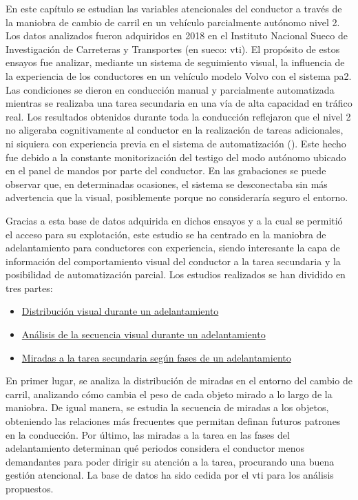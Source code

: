 En este capítulo se estudian las variables atencionales del conductor a través de la maniobra de cambio de carril en un vehículo parcialmente autónomo nivel 2. Los datos analizados fueron adquiridos en 2018 en el Instituto Nacional Sueco de Investigación de Carreteras y Transportes (en sueco: \gls{vti}). El propósito de estos ensayos fue analizar, mediante un sistema de seguimiento visual, la influencia de la experiencia de los conductores en un vehículo modelo Volvo con el sistema \gls{pa2}. Las condiciones se dieron en conducción manual y parcialmente automatizada mientras se realizaba una tarea secundaria en una vía de alta capacidad en tráfico real. Los resultados obtenidos durante toda la conducción reflejaron que el nivel 2 no aligeraba cognitivamente al conductor en la realización de tareas adicionales, ni siquiera con experiencia previa en el sistema de automatización (\cite{solismarcos}). Este hecho fue debido a la constante monitorización del testigo del modo autónomo ubicado en el panel de mandos por parte del conductor. En las grabaciones se puede observar que, en determinadas ocasiones, el sistema se desconectaba sin más advertencia que la visual, posiblemente porque no consideraría seguro el entorno.

Gracias a esta base de datos adquirida en dichos ensayos y a la cual se permitió el acceso para su explotación, este estudio se ha centrado en la maniobra de adelantamiento para conductores con experiencia, siendo interesante la capa de información del comportamiento visual del conductor a la tarea secundaria y la posibilidad de automatización parcial. Los estudios realizados se han dividido en tres partes:

\begin{itemize}
    \item \hyperref[3231]{Distribución visual durante un adelantamiento}
    \item \hyperref[3232]{Análisis de la secuencia visual durante un adelantamiento}
    \item \hyperref[3233]{Miradas a la tarea secundaria según fases de un adelantamiento}
\end{itemize}

En primer lugar, se analiza la distribución de miradas en el entorno del cambio de carril, analizando cómo cambia el peso de cada objeto mirado a lo largo de la maniobra. De igual manera, se estudia la secuencia de miradas a los objetos, obteniendo las relaciones más frecuentes que permitan definan futuros patrones en la conducción. Por último, las miradas a la tarea en las fases del adelantamiento determinan qué periodos considera el conductor menos demandantes para poder dirigir su atención a la tarea, procurando una buena gestión atencional. La base de datos ha sido cedida por el \gls{vti} para los análisis propuestos.

